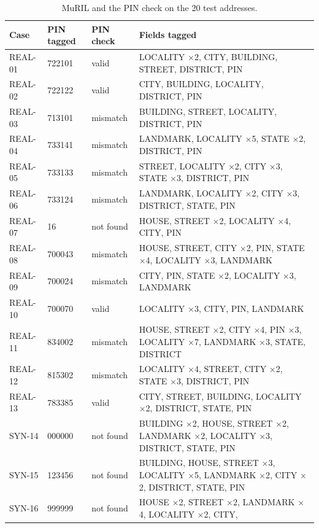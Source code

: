 \documentclass[11pt,a4paper]{article}
\begin{document}
\begin{table}[H]
\centering\small
\caption[Stress test: the result for each address]{MuRIL and the PIN check on the 20 test addresses.}\label{tab:stress}
\begin{tabularx}{\textwidth}{@{}lllL@{}}
\toprule
\textbf{Case} & \textbf{PIN tagged} & \textbf{PIN check} & \textbf{Fields tagged}\\
\midrule
REAL-01 & 722101 & valid & LOCALITY $\times$2, CITY, BUILDING, STREET, DISTRICT, PIN\\
REAL-02 & 722122 & valid & CITY, BUILDING, LOCALITY, DISTRICT, PIN\\
REAL-03 & 713101 & mismatch & BUILDING, STREET, LOCALITY, DISTRICT, PIN\\
REAL-04 & 733141 & mismatch & LANDMARK, LOCALITY $\times$5, STATE $\times$2, DISTRICT, PIN\\
REAL-05 & 733133 & mismatch & STREET, LOCALITY $\times$2, CITY $\times$3, STATE $\times$3, DISTRICT, PIN\\
REAL-06 & 733124 & mismatch & LANDMARK, LOCALITY $\times$2, CITY $\times$3, DISTRICT, STATE, PIN\\
REAL-07 & 16 & not found & HOUSE, STREET $\times$2, LOCALITY $\times$4, CITY, PIN\\
REAL-08 & 700043 & mismatch & HOUSE, STREET, CITY $\times$2, PIN, STATE $\times$4, LOCALITY $\times$3, LANDMARK\\
REAL-09 & 700024 & mismatch & CITY, PIN, STATE $\times$2, LOCALITY $\times$3, LANDMARK\\
REAL-10 & 700070 & valid & LOCALITY $\times$3, CITY, PIN, LANDMARK\\
REAL-11 & 834002 & mismatch & HOUSE, STREET $\times$2, CITY $\times$4, PIN $\times$3, LOCALITY $\times$7, LANDMARK
$\times$3, STATE, DISTRICT\\
REAL-12 & 815302 & mismatch & LOCALITY $\times$4, STREET, CITY $\times$2, STATE $\times$3, DISTRICT, PIN\\
REAL-13 & 783385 & valid & CITY, STREET, BUILDING, LOCALITY $\times$2, DISTRICT, STATE, PIN\\
\midrule
SYN-14 & 000000 & not found & BUILDING $\times$2, HOUSE, STREET $\times$2, LANDMARK $\times$2, LOCALITY $\times$3,
DISTRICT, STATE, PIN\\
SYN-15 & 123456 & not found & BUILDING, HOUSE, STREET $\times$3, LOCALITY $\times$5, LANDMARK $\times$2, CITY
$\times$2, DISTRICT, STATE, PIN\\
SYN-16 & 999999 & not found & HOUSE $\times$2, STREET $\times$2, LANDMARK $\times$4, LOCALITY $\times$2, CITY,

\end{tabularx}
\end{table}
\end{document}
